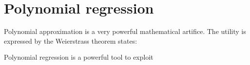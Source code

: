 \section{Polynomial regression}

Polynomial approximation is a very powerful mathematical artifice. The utility is expressed by the
Weierstrass theorem states:

Polynomial regression is a powerful tool to exploit


\endinput  %